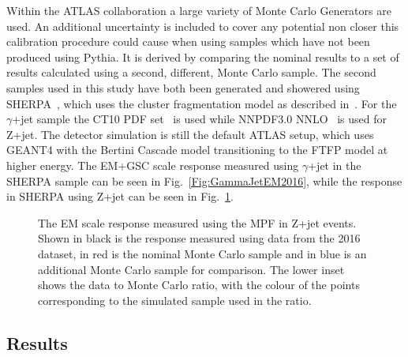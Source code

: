 Within the ATLAS collaboration a large variety of Monte Carlo Generators are used.  
An additional uncertainty is included to cover any potential non closer this calibration procedure could cause when using samples which have not been produced using Pythia.  
It is derived by comparing the nominal results to a set of results calculated using a second, different, Monte Carlo sample.  
The second samples used in this study have both been generated and showered using {\sc SHERPA}~\cite{Gleisberg:2008ta}, which uses the cluster fragmentation model as described in~\cite{1983NuPhB.214..201G}.  
For the $\gamma$+jet sample the CT10 PDF set~\cite{Lai:2010vv} is used while NNPDF3.0 NNLO~\cite{Ball:2014uwa} is used for Z+jet.  
The detector simulation is still the default ATLAS setup, which uses GEANT4 with the Bertini Cascade model transitioning to the FTFP model at higher energy.   
The EM+GSC scale response measured using $\gamma$+jet in the {\sc SHERPA} sample can be seen in Fig.~\ref{Fig:GammaJetEM2016}, while the response in {\sc SHERPA} using Z+jet can be seen in Fig.~\ref{Fig:ZJetEM2016}.  

\begin{figure}[!ht]
 \begin{center}
 \end{center}
 \caption[EM scale response using Z+jet in 2016]
 {\small The EM scale response measured using the MPF in Z+jet events.  Shown in black is the response measured using data from the 2016 dataset, in red is the nominal Monte Carlo sample and in blue is an additional Monte Carlo sample for comparison.  The lower inset shows the data to Monte Carlo ratio, with the colour of the points corresponding to the simulated sample used in the ratio.  }
 \label{Fig:ZJetEM2016}
\end{figure}

\subsection{Results}


